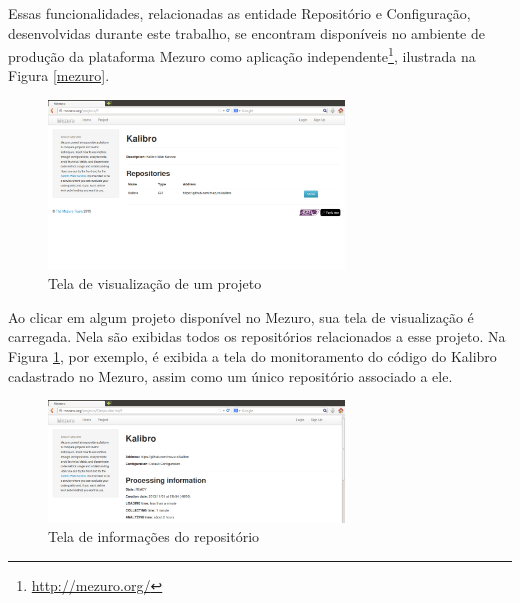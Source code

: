
Essas funcionalidades, relacionadas as entidade Repositório e Configuração, desenvolvidas durante este trabalho, se encontram disponíveis no ambiente de produção da plataforma Mezuro como aplicação independente\footnote{\url{http://mezuro.org/}},  ilustrada na Figura \ref{mezuro}.

\graphicspath{{figuras/}}
\begin{figure}[h]
\centering
\includegraphics[width=0.7\textwidth]{mezuro-repositories}
\caption{Tela de visualização de um projeto}
\label{fig:mezuro-repositories}
\end{figure}

Ao clicar em algum projeto disponível no Mezuro, sua tela de visualização é carregada. Nela são exibidas todos os repositórios relacionados a esse projeto. Na Figura \ref{fig:mezuro-repositories}, por exemplo, é exibida a tela do monitoramento do código do Kalibro cadastrado no Mezuro, assim como um único repositório associado a ele.

\graphicspath{{figuras/}}
\begin{figure}[h]
\centering
\includegraphics[width=0.7\textwidth]{mezuro-info}
\caption{Tela de informações do repositório}
\label{fig:mezuro-info}
\end{figure}

